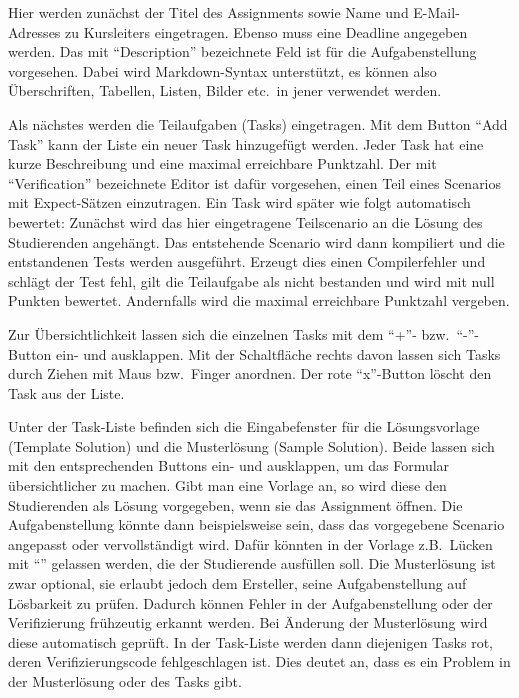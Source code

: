 Hier werden zunächst der Titel des Assignments sowie Name und E-Mail-Adresses zu Kursleiters eingetragen.
Ebenso muss eine Deadline angegeben werden.
Das mit ``Description'' bezeichnete Feld ist für die Aufgabenstellung vorgesehen.
Dabei wird Markdown-Syntax unterstützt, es können also Überschriften, Tabellen, Listen, Bilder etc.\ in jener verwendet werden.

Als nächstes werden die Teilaufgaben (Tasks) eingetragen.
Mit dem Button ``Add Task'' kann der Liste ein neuer Task hinzugefügt werden.
Jeder Task hat eine kurze Beschreibung und eine maximal erreichbare Punktzahl.
Der mit ``Verification'' bezeichnete Editor ist dafür vorgesehen, einen Teil eines Scenarios mit Expect-Sätzen einzutragen.
Ein Task wird später wie folgt automatisch bewertet:
Zunächst wird das hier eingetragene Teilscenario an die Lösung des Studierenden angehängt.
Das entstehende Scenario wird dann kompiliert und die entstandenen Tests werden ausgeführt.
Erzeugt dies einen Compilerfehler und schlägt der Test fehl, gilt die Teilaufgabe als nicht bestanden und wird mit null Punkten bewertet.
Andernfalls wird die maximal erreichbare Punktzahl vergeben.

Zur Übersichtlichkeit lassen sich die einzelnen Tasks mit dem ``+''- bzw.\ ``-''-Button ein- und ausklappen.
Mit der Schaltfläche rechts davon lassen sich Tasks durch Ziehen mit Maus bzw.\ Finger anordnen.
Der rote ``x''-Button löscht den Task aus der Liste.

Unter der Task-Liste befinden sich die Eingabefenster für die Lösungsvorlage (Template Solution) und die Musterlösung (Sample Solution).
Beide lassen sich mit den entsprechenden Buttons ein- und ausklappen, um das Formular übersichtlicher zu machen.
Gibt man eine Vorlage an, so wird diese den Studierenden als Lösung vorgegeben, wenn sie das Assignment öffnen.
Die Aufgabenstellung könnte dann beispielsweise sein, dass das vorgegebene Scenario angepasst oder vervollständigt wird.
Dafür könnten in der Vorlage z.B.\ Lücken mit ``'' gelassen werden, die der Studierende ausfüllen soll.
Die Musterlösung ist zwar optional, sie erlaubt jedoch dem Ersteller, seine Aufgabenstellung auf Lösbarkeit zu prüfen.
Dadurch können Fehler in der Aufgabenstellung oder der Verifizierung frühzeutig erkannt werden.
Bei Änderung der Musterlösung wird diese automatisch geprüft.
In der Task-Liste werden dann diejenigen Tasks rot, deren Verifizierungscode fehlgeschlagen ist.
Dies deutet an, dass es ein Problem in der Musterlösung oder des Tasks gibt.

